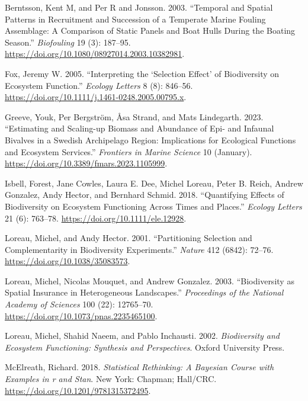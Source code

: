 \documentclass[
  letterpaper,
  DIV=11,
  numbers=noendperiod]{scrartcl}
\newlength{\cslhangindent}
\newenvironment{CSLReferences}[2] %
 {\begin{list}{}{%
  \setlength{\itemindent}{0pt}
  \setlength{\leftmargin}{0pt}
  \setlength{\parsep}{0pt}
  \ifodd #1
   \setlength{\leftmargin}{\cslhangindent}
   \setlength{\itemindent}{-1\cslhangindent}
  \fi
  \setlength{\itemsep}{#2\baselineskip}}}
 {\end{list}}
\begin{document}
\label{refs}
\begin{CSLReferences}{1}{0}
Berntsson, Kent M, and Per R and Jonsson. 2003. {``Temporal and Spatial
Patterns in Recruitment and Succession of a Temperate Marine Fouling
Assemblage: A Comparison of Static Panels and Boat Hulls During the
Boating Season.''} \emph{Biofouling} 19 (3): 187--95.
\url{https://doi.org/10.1080/08927014.2003.10382981}.

Fox, Jeremy W. 2005. {``Interpreting the {`}Selection Effect{'} of
Biodiversity on Ecosystem Function.''} \emph{Ecology Letters} 8 (8):
846--56. \url{https://doi.org/10.1111/j.1461-0248.2005.00795.x}.

Greeve, Youk, Per Bergström, Åsa Strand, and Mats Lindegarth. 2023.
{``Estimating and Scaling-up Biomass and Abundance of Epi- and Infaunal
Bivalves in a Swedish Archipelago Region: Implications for Ecological
Functions and Ecosystem Services.''} \emph{Frontiers in Marine Science}
10 (January). \url{https://doi.org/10.3389/fmars.2023.1105999}.

Isbell, Forest, Jane Cowles, Laura E. Dee, Michel Loreau, Peter B.
Reich, Andrew Gonzalez, Andy Hector, and Bernhard Schmid. 2018.
{``Quantifying Effects of Biodiversity on Ecosystem Functioning Across
Times and Places.''} \emph{Ecology Letters} 21 (6): 763--78.
\url{https://doi.org/10.1111/ele.12928}.

Loreau, Michel, and Andy Hector. 2001. {``Partitioning Selection and
Complementarity in Biodiversity Experiments.''} \emph{Nature} 412
(6842): 72--76. \url{https://doi.org/10.1038/35083573}.

Loreau, Michel, Nicolas Mouquet, and Andrew Gonzalez. 2003.
{``Biodiversity as Spatial Insurance in Heterogeneous Landscapes.''}
\emph{Proceedings of the National Academy of Sciences} 100 (22):
12765--70. \url{https://doi.org/10.1073/pnas.2235465100}.

Loreau, Michel, Shahid Naeem, and Pablo Inchausti. 2002.
\emph{Biodiversity and Ecosystem Functioning: Synthesis and
Perspectives}. Oxford University Press.

McElreath, Richard. 2018. \emph{Statistical Rethinking: A Bayesian
Course with Examples in r and Stan}. New York: Chapman; Hall/CRC.
\url{https://doi.org/10.1201/9781315372495}.


\end{CSLReferences}
\end{document}
